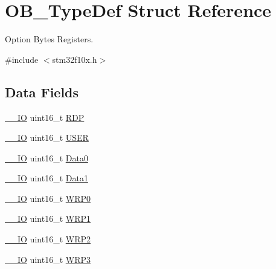 \hypertarget{struct_o_b___type_def}{}\section{O\+B\+\_\+\+Type\+Def Struct Reference}
\label{struct_o_b___type_def}


Option Bytes Registers.  




{\ttfamily \#include $<$stm32f10x.\+h$>$}

\subsection*{Data Fields}
\begin{DoxyCompactItemize}
\item 
\mbox{\hyperlink{core__sc300_8h_aec43007d9998a0a0e01faede4133d6be}{\+\_\+\+\_\+\+IO}} uint16\+\_\+t \mbox{\hyperlink{struct_o_b___type_def_ae708f301b866ad2a81ed39efba639aab}{R\+DP}}
\item 
\mbox{\hyperlink{core__sc300_8h_aec43007d9998a0a0e01faede4133d6be}{\+\_\+\+\_\+\+IO}} uint16\+\_\+t \mbox{\hyperlink{struct_o_b___type_def_a67442d4e459bba2c40fa62914d78ec1e}{U\+S\+ER}}
\item 
\mbox{\hyperlink{core__sc300_8h_aec43007d9998a0a0e01faede4133d6be}{\+\_\+\+\_\+\+IO}} uint16\+\_\+t \mbox{\hyperlink{struct_o_b___type_def_a76b31b1239a451ee8f397289265bdf6b}{Data0}}
\item 
\mbox{\hyperlink{core__sc300_8h_aec43007d9998a0a0e01faede4133d6be}{\+\_\+\+\_\+\+IO}} uint16\+\_\+t \mbox{\hyperlink{struct_o_b___type_def_aa081efb0cb15b6ffd486d23a89144142}{Data1}}
\item 
\mbox{\hyperlink{core__sc300_8h_aec43007d9998a0a0e01faede4133d6be}{\+\_\+\+\_\+\+IO}} uint16\+\_\+t \mbox{\hyperlink{struct_o_b___type_def_ad43c7a196f0eef88b3038383c4f7d903}{W\+R\+P0}}
\item 
\mbox{\hyperlink{core__sc300_8h_aec43007d9998a0a0e01faede4133d6be}{\+\_\+\+\_\+\+IO}} uint16\+\_\+t \mbox{\hyperlink{struct_o_b___type_def_ac4e091dcb644dbb5d4a2c7aca7d4fe88}{W\+R\+P1}}
\item 
\mbox{\hyperlink{core__sc300_8h_aec43007d9998a0a0e01faede4133d6be}{\+\_\+\+\_\+\+IO}} uint16\+\_\+t \mbox{\hyperlink{struct_o_b___type_def_a05486d021c6761bf5a04f410a1c24e06}{W\+R\+P2}}
\item 
\mbox{\hyperlink{core__sc300_8h_aec43007d9998a0a0e01faede4133d6be}{\+\_\+\+\_\+\+IO}} uint16\+\_\+t \mbox{\hyperlink{struct_o_b___type_def_a7d9c1634a4c6027e12345f25d9d15b4d}{W\+R\+P3}}
\end{DoxyCompactItemize}


